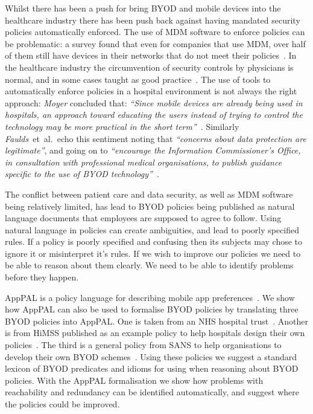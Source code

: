 \documentclass[a4paper]{article}
\makeatletter
\newcommand{\etal}[0]{et~al{.}\@}
\newcommand{\apppal}[0]{App{P}{A}{L}}
\makeatother
\begin{document}
Whilst there has been a push for bring \ac{BYOD} and mobile devices into the healthcare industry there has been push back against having mandated security policies automatically enforced.  
The use of \ac{MDM} software to enforce policies can be problematic:
  a survey found that even for companies that use \ac{MDM}, over half of them still have devices in their networks that do not meet their policies~\cite{mobileiron_security_labs_q4_2015}.
In the healthcare industry the circumvention of security controls by physicians is normal, and in some cases taught as good practice~\cite{koppel_workarounds_2015}.
The use of tools to automatically enforce policies in a hospital environment is not always the right approach:
\emph{Moyer} concluded that:
\emph{``Since mobile devices are already being used in hospitals, an approach toward educating the users instead of trying to control the technology may be more practical in the short term''}~\cite{moyer_managing_2013}.
Similarly \emph{Faulds}~\etal~echo this sentiment noting that \emph{``concerns about data protection are legitimate''}, and going on to \emph{``encourage the Information Commissioner’s Office, in consultation with professional medical organisations, to publish guidance specific to the use of BYOD technology''}~\cite{faulds_feasibility_2016}.

The conflict between patient care and data security, as well as \ac{MDM} software being relatively limited, has lead to \ac{BYOD} policies being published as natural language documents that employees are supposed to agree to follow.
Using natural language in policies can create ambiguities, and lead to poorly specified rules.
If a policy is poorly specified and confusing then its subjects may chose to ignore it or misinterpret it's rules.
If we wish to improve our policies we need to be able to reason about them clearly.
We need to be able to identify problems before they happen.


\apppal{} is a policy language for describing mobile app preferences~\cite{hallett_apppal_2016}.
We show how \apppal{} can also be used to formalise \ac{BYOD} policies by translating three \ac{BYOD} policies into \apppal{}.
One is taken from an NHS hospital trust~\cite{kennington_mobiles_2014}. 
Another is from \ac{HiMSS} published as an example policy to help hospitals design their own policies~\cite{healthcare_information_and_management_systems_society_mobile_2012}.
The third is a  general policy from SANS to help organisations to develop their own \ac{BYOD} schemes~\cite{nicholas_r._c._guerin_security_2008}.
Using these policies we suggest a standard lexicon of BYOD predicates and idioms for using when reasoning about \ac{BYOD} policies. 
With the AppPAL formalisation we show how problems with reachability and redundancy can be identified automatically, and suggest where the policies could be improved.
\end{document}
